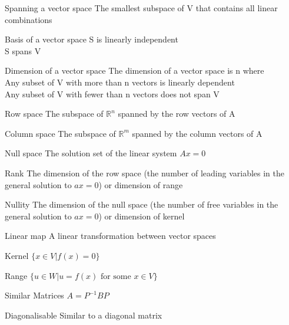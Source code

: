 \documentclass[grid,avery5371]{flashcards}
\begin{document}
\begin{flashcard}[]{Spanning a vector space}
	The smallest subspace of V that contains all linear combinations
\end{flashcard}


\begin{flashcard}[]{Basis of a vector space}
	S is linearly independent\\
	S spans V
\end{flashcard}

\begin{flashcard}[]{Dimension of a vector space}
	The dimension of a vector space is n where\\
	Any subset of V with more than n vectors is linearly dependent\\
	Any subset of V with fewer than n vectors does not span V
\end{flashcard}

\begin{flashcard}[]{Row space}
	The subspace of $\mathbb{R}^n$ spanned by the row vectors of A
\end{flashcard}

\begin{flashcard}[]{Column space}
	The subspace of $\mathbb{R}^m$ spanned by the column vectors of A
\end{flashcard}

\begin{flashcard}[]{Null space}
	The solution set of the linear system $Ax=0$
\end{flashcard}

\begin{flashcard}[]{Rank}
	The dimension of the row space (the number of leading variables in the general solution to $ax=0$) or dimension of range
\end{flashcard}

\begin{flashcard}[]{Nullity}
	The dimension of the null space (the number of free variables in the general solution to $ax=0$) or dimension of kernel
\end{flashcard}

\begin{flashcard}[]{Linear map}
	A linear transformation between vector spaces
\end{flashcard}

\begin{flashcard}[]{Kernel}
	$\{x\in V| f(x)=0\}$
\end{flashcard}

\begin{flashcard}[]{Range}
	$\{u\in W| u=f(x) \text{ for some } x\in V\}$
\end{flashcard}

\begin{flashcard}[]{Similar Matrices}
	$A=P^{-1}BP$
\end{flashcard}

\begin{flashcard}[]{Diagonalisable}
	Similar to a diagonal matrix
\end{flashcard}
\end{document}
